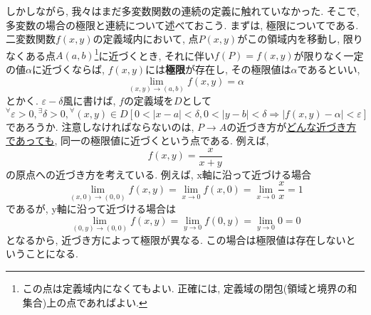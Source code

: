         しかしながら, 我々はまだ多変数関数の連続の定義に触れていなかった. そこで, 多変数の場合の極限と連続について述べておこう.
        まずは, 極限についてである. 二変数関数$f(x,y)$の定義域内において, 点$P(x,y)$がこの領域内を移動し, 限りなくある点$A(a,b)$\footnote{この点は定義域内になくてもよい. 正確には, 定義域の閉包(領域と境界の和集合)上の点であればよい.}に近づくとき, 
        それに伴い$f(P)=f(x,y)$が限りなく一定の値$\alpha$に近づくならば, $f(x,y)$には\textbf{極限}が存在し, その極限値は$\alpha$であるといい,
        \begin{equation}
            \lim_{(x,y)\rightarrow(a,b)}f(x,y)=\alpha \label{eq:偏微分:二変数関数の極限}
        \end{equation}
        とかく. $\varepsilon-\delta$風に書けば, $f$の定義域を$D$として
        \begin{equation}
            {}^\forall \varepsilon>0,{}^\exists \delta>0,{}^\forall(x,y)\in D \left[0<|x-a|<\delta,0<|y-b|<\delta\Rightarrow |f(x,y)-\alpha|<\varepsilon\right] \label{eq:偏微分:二変数関数の極限の定義}
        \end{equation}
        であろうか. 注意しなければならないのは, $P\rightarrow A$の近づき方が\underline{どんな近づき方であっても}, 同一の極限値に近づくという点である.
        例えば, 
        \begin{equation*}
            f(x,y)=\frac{x}{x+y}
        \end{equation*}
        の原点への近づき方を考えている. 例えば, x軸に沿って近づける場合
        \begin{equation*}
            \lim_{(x,0)\rightarrow (0,0)}f(x,y)=\lim_{x\rightarrow 0}f(x,0)=\lim_{x\rightarrow 0}\frac{x}{x}=1
        \end{equation*}
        であるが, y軸に沿って近づける場合は
        \begin{equation*}
            \lim_{(0,y)\rightarrow (0,0)}f(x,y)=\lim_{y\rightarrow 0}f(0,y)=\lim_{y\rightarrow 0}0=0
        \end{equation*}
        となるから, 近づき方によって極限が異なる. この場合は極限値は存在しないということになる.


